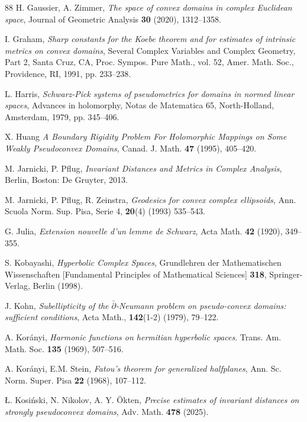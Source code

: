 \documentclass[11pt, reqno]{amsart}
\numberwithin{equation}{section}
\theoremstyle{definition}
\begin{document}
{{{\begin{thebibliography}{88}
		 H. Gaussier, A. Zimmer, {\sl The space of convex domains in complex Euclidean space}, Journal of Geometric Analysis {\bf 30} (2020), 1312--1358.
		
		 I. Graham, {\sl Sharp constants for the Koebe theorem and for estimates of intrinsic metrics on convex domains}, Several Complex Variables and Complex Geometry, Part 2, Santa Cruz, CA, Proc. Sympos. Pure Math., vol. 52, Amer. Math. Soc., Providence, RI, 1991, pp. 233--238.
		
		L. Harris, {\sl  Schwarz-Pick systems of pseudometrics for domains in normed linear spaces}, Advances in holomorphy, Notas de Matematica 65, North-Holland, Amsterdam, 1979, pp. 345--406.
		
		 X. Huang {\sl A Boundary Rigidity Problem For Holomorphic Mappings on Some Weakly Pseudoconvex Domains}, Canad. J. Math. {\bf 47} (1995), 405--420.
		
		 M. Jarnicki, P. Pflug, {\sl Invariant Distances and Metrics in Complex Analysis}, Berlin, Boston: De Gruyter, 2013.
		
		 M. Jarnicki, P. Pflug, R. Zeinstra, {\sl Geodesics for convex complex ellipsoids}, Ann. Scuola Norm. Sup. Pisa, Serie 4,  {\bf 20}(4) (1993) 535--543.
		
		 G. Julia, {\sl Extension nouvelle d'un lemme de Schwarz}, Acta Math. {\bf 42}  (1920), 349--355.
		
		 S. Kobayashi, {\sl Hyperbolic Complex Spaces}, Grundlehren der Mathematischen Wissenschaften [Fundamental Principles of Mathematical Sciences] {\bf 318}, Springer-Verlag, Berlin (1998).
		
		 J. Kohn, {\sl Subellipticity of the $\bar \partial$-Neumann problem on pseudo-convex domains: sufficient conditions}, Acta Math., {\bf 142}(1-2)  (1979), 79--122.
		
		 A. Kor\'anyi, {\sl Harmonic functions on hermitian hyperbolic spaces}. Trans. Am. Math. Soc. {\bf 135} (1969), 507--516.
		
		
		  A. Kor\'anyi, E.M. Stein, {\sl Fatou’s theorem for generalized halfplanes}, Ann. Sc. Norm. Super. Pisa {\bf 22} (1968), 107--112.

		 Ł. Kosiński, N. Nikolov, A. Y. Ökten, {\sl Precise estimates of invariant distances on strongly pseudoconvex domains}, Adv. Math. {\bf 478} (2025).
		

\end{thebibliography}}}}
\end{document}
